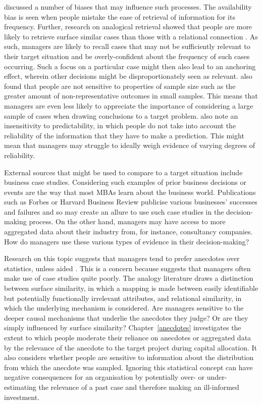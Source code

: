 \documentclass[a4paper, nobind, dvipsnames]{templates/ociamthesis}
\theoremstyle{definition}
\theoremstyle{definition}
\theoremstyle{definition}
\theoremstyle{definition}
\theoremstyle{remark}
\begin{document}
\textcite{tversky1974} discussed a number of biases that may influence such processes. The
availability bias is seen when people mistake the ease of retrieval of
information for its frequency. Further, research on analogical retrieval showed
that people are more likely to retrieve surface similar cases than those with a
relational connection \autocite{gentner1993}. As such, managers are likely to recall
cases that may not be sufficiently relevant to their target situation and be
overly-confident about the frequency of such cases occurring. Such a focus on a
particular case might then also lead to an anchoring effect, wherein other
decisions might be disproportionately seen as relevant. \textcite{tversky1974} also found
that people are not sensitive to properties of sample size such as the greater
amount of non-representative outcomes in small samples. This means that managers
are even less likely to appreciate the importance of considering a large sample
of cases when drawing conclusions to a target problem. \textcite{tversky1974} also note an
insensitivity to predictability, in which people do not take into account the
reliability of the information that they have to make a prediction. This might
mean that managers may struggle to ideally weigh evidence of varying degrees of
reliability.

External sources that might be used to compare to a target situation include
business case studies. Considering such examples of prior business decisions or
events are the way that most MBAs learn about the business world. Publications
such as Forbes or Harvard Business Review publicise various businesses'
successes and failures and so may create an allure to use such case studies in
the decision-making process. On the other hand, managers may have access to more
aggregated data about their industry from, for instance, consultancy companies.
How do managers use these various types of evidence in their decision-making?

Research on this topic suggests that managers tend to prefer anecdotes over
statistics, unless aided \autocite{wainberg2018}. This is a concern because \textcite{gavetti2005}
suggests that managers often make use of case studies quite poorly. The analogy
literature draws a distinction between surface similarity, in which a mapping is
made between easily identifiable but potentially functionally irrelevant
attributes, and relational similarity, in which the underlying mechanism is
considered. Are managers sensitive to the deeper causal mechanisms that underlie
the anecdotes they judge? Or are they simply influenced by surface similarity?
Chapter~\ref{anecdotes} investigates the extent to which people moderate their
reliance on anecdotes or aggregated data by the relevance of the anecdote to the
target project during capital allocation. It also considers whether people are
sensitive to information about the distribution from which the anecdote was
sampled. Ignoring this statistical concept can have negative consequences for an
organisation by potentially over- or under-estimating the relevance of a past
case and therefore making an ill-informed investment.
\end{document}
